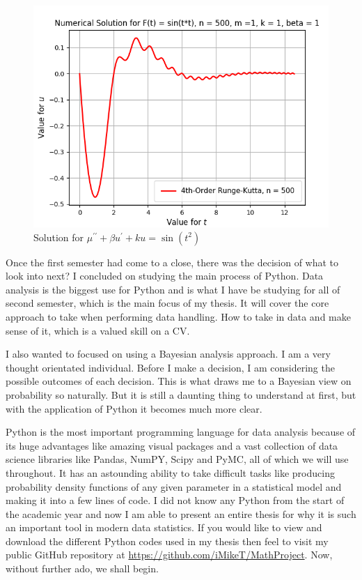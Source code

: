 \documentclass[12pt,twoside]{report}   %
\begin{document}
\begin{figure}[H]
\centering
\includegraphics[width = 5in]{Kuttaadv.png}
\caption{Solution for $\mu^{\prime\prime} + \beta u^{\prime} + ku = \sin(t^2)$}
\label{figKuttaadv}
\end{figure}

\pagebreak
Once the first semester had come to a close, there was the decision of what to look into next? I concluded on studying the main process of Python. Data analysis is the biggest use for Python and is what I have be studying for all of second semester, which is the main focus of my thesis. It will cover the core approach to take when performing data handling. How to take in data and make sense of it, which is a valued skill on a CV.

I also wanted to focused on using a Bayesian analysis approach. I am a very thought orientated individual. Before I make a decision, I am considering the possible outcomes of each decision. This is what draws me to a Bayesian view on probability so naturally. But it is still a daunting thing to understand at first, but with the application of Python it becomes much more clear.

Python is the most important programming language for data analysis because of its huge advantages like amazing visual packages and a vast collection of data science libraries like Pandas, NumPY, Scipy and PyMC, all of which we will use throughout. It has an astounding ability to take difficult tasks like producing probability density functions of any given parameter in a statistical model and making it into a few lines of code. I did not know any Python from the start of the academic year and now I am able to present an entire thesis for why it is such an important tool in modern data statistics. If you would like to view and download the different Python codes used in my thesis then feel to visit my public GitHub repository at \url{https://github.com/iMikeT/MathProject}. Now, without further ado, we shall begin.
\end{document}
